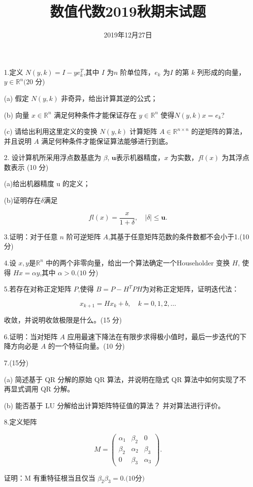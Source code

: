 \documentclass{article}
\title{数值代数2019秋期末试题}
\author{2019年12月27日}
\date{}
\begin{document}
	\maketitle
1.定义 $N(y,k)=I-ye_k^T$,其中 $I$ 为$ n $ 阶单位阵，$e_k$ 为$ I $ 的第 $k$ 列形成的向量，$y\in\mathbb{R}^n(20$ 分)

(a) 假定 $N(y,k)$ 非奇异，给出计算其逆的公式；

(b) 向量 $x\in\mathbb{R}^n$ 满足何种条件才能保证存在 $y\in\mathbb{R}^n$ 使得$N\left(y,k\right)x=e_{k}$?

(c) 请给出利用这里定义的变换 $N(y,k)$ 计算矩阵 $A\in\mathbb{R}^{n\times n}$ 的逆矩阵的算法，并且说明 $A$ 满足何种条件才能保证算法能够进行到底。

2. 设计算机所采用浮点数基底为 $\beta$, $\mathbf{u}$表示机器精度，$x$ 为实数，$fl\left(x\right)$ 为其浮点数表示 (10 分)

(a)给出机器精度 u 的定义；

(b)证明存在$\delta$满足

$$
fl(x)=\frac{x}{1+\delta},\quad|\delta|\leqslant\mathbf{u}.
$$

3.证明：对于任意 $n$ 阶可逆矩阵 $A$,其基于任意矩阵范数的条件数都不会小于1.(10分)

4.设 $x, y$是$\mathbb{R} ^n$ 中的两个非零向量，给出一个算法确定一个Householder 变换 $H$, 使得 $Hx=\alpha y$,其中 $\alpha>0.(10$ 分)

5.若存在对称正定矩阵 $P$,使得 $B=P-H^TPH $为对称正定矩阵，证明迭代法：

$$
x_{k+1}=Hx_{k}+b,\quad k=0,1,2,\ldots 
$$

收敛，并说明收敛极限是什么。(15 分)

6.证明：当对矩阵 $A$ 应用最速下降法在有限步求得极小值时，最后一步迭代的下降方向必是 $A$ 的一个特征向量。(10 分)

7.(15分)

(a) 简述基于 QR 分解的原始 QR 算法，并说明在隐式 QR 算法中如何实现了不再显式调用 QR 分解。

(b) 能否基于 LU 分解给出计算矩阵特征值的算法？ 并对算法进行评价。


8.定义矩阵

$$\left.M=\left(\begin{array}{ccc}\alpha_1&\beta_2&0\\\beta_2&\alpha_2&\beta_3\\0&\beta_3&\alpha_3\end{array}\right.\right).$$

证明：M 有重特征根当且仅当 $\beta_{2}\beta_{3}= 0.( 10$分$) $
\end{document}

